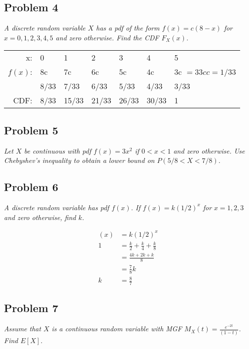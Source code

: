 \documentclass[a4paper,man,natbib]{apa6}
\begin{document}
\subsection{Problem 4}
\emph{A discrete random variable $X$ has a pdf of the form $f(x) = c(8−x)$ for $x = 0,1,2,3,4,5$ and zero otherwise.  Find the CDF $F_X(x)$.}

\begin{tabular}{rllllll}
	x:  & 0    & 1     & 2     & 3     & 4     & 5    \\  
	$f(x)$: & 8c   & 7c    & 6c    & 5c    & 4c    & 3c  \hspace{3em} $= 33c$\hspace{2em}$c=1/33$ \\
	& 8/33 & 7/33  & 6/33  & 5/33  & 4/33  & 3/33 \\
	CDF: & 8/33 & 15/33 & 21/33 & 26/33 & 30/33 & 1   
\end{tabular}

\subsection{Problem 5}
\emph{Let $X$ be continuous with pdf $f(x)=3x^2$ if $0<x<1$ and zero otherwise.  Use Chebyshev's inequality to obtain a lower bound on $P(5/8<X<7/8)$.}\vspace{1em}


\subsection{Problem 6}
\emph{A discrete random variable has pdf $f(x)$. If $f(x)=k(1/2)^x$ for $x=1,2,3$ and zero otherwise, find $k$.} \vspace{1em}

\begin{align*}
	(x) &= k(1/2)^x \\
	1 &= \frac{k}{2} + \frac{k}{4} + \frac{k}{8} \\
	&= \frac{4k + 2k + k}{8} \\
	&= \frac{7}{8}k \\
	k &= \frac{8}{7}
\end{align*}

\subsection{Problem 7}
\emph{Assume that $X$	is a continuous random variable with MGF $M_X(t)= \frac{e^{−2t}}{(1−t)}$. \\ Find $E[X]$.}\vspace{1em}
 
\end{document}
